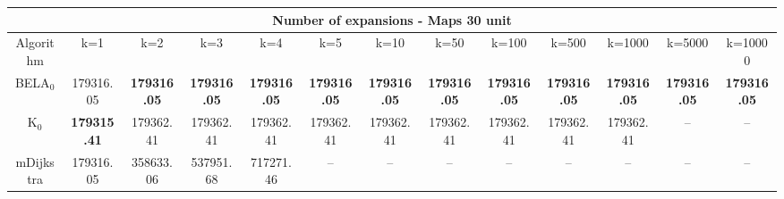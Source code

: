 \begin{tabular}{c|cccccccccccc}\toprule
\multicolumn{13}{c}{Number of expansions - Maps 30 unit}\\ \midrule
Algorithm & k=1 & k=2 & k=3 & k=4 & k=5 & k=10 & k=50 & k=100 & k=500 & k=1000 & k=5000 & k=10000 \\ \midrule
BELA$_0$ & 179316.05 & \textbf{179316.05} & \textbf{179316.05} & \textbf{179316.05} & \textbf{179316.05} & \textbf{179316.05} & \textbf{179316.05} & \textbf{179316.05} & \textbf{179316.05} & \textbf{179316.05} & \textbf{179316.05} & \textbf{179316.05} \\
K$_0$ & \textbf{179315.41} & 179362.41 & 179362.41 & 179362.41 & 179362.41 & 179362.41 & 179362.41 & 179362.41 & 179362.41 & 179362.41 & -- & -- \\
mDijkstra & 179316.05 & 358633.06 & 537951.68 & 717271.46 & -- & -- & -- & -- & -- & -- & -- & -- \\ \bottomrule 
\end{tabular}
